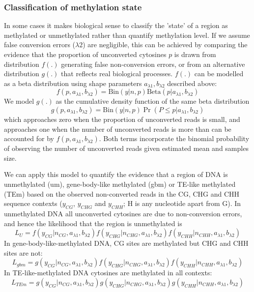 \documentclass[12pt,longbibliography]{article}
\begin{document}
\subsubsection{Classification of methylation state} \label{sec:meth-state}

In some cases it makes biological sense to classify the 'state' of a region as methylated or unmethylated rather than quantify methylation level.
If we assume false conversion errors ($\lambda2$) are negligible, this can be achieved by comparing the evidence that the proportion of unconverted cytosines $p$ is drawn from distribution $f(.)$ generating false non-conversion errors, or from an alternative distribution $g(.)$ that reflects real biological processes.
$f(.)$ can be modelled as a beta distribution using shape parameters $a_{\lambda1}, b_{\lambda2}$ described above:
\begin{equation}
    f(p,a_{\lambda1}, b_{\lambda2}) = 
    \textrm{Bin}(y|n,p)
    \textrm{Beta}(p | a_{\lambda1}, b_{\lambda2})
\end{equation}
We model $g(.)$ as the cumulative density function of the same beta distribution
\begin{equation}
    g(p,a_{\lambda1}, b_{\lambda2}) = 
    \textrm{Bin}(y|n,p)
    \Pr( P \leq p | a_{\lambda1}, b_{\lambda2})
\end{equation}
which approaches zero when the proportion of unconverted reads is small, and approaches one when the number of unconverted reads is more than can be accounted for by $ f(p,a_{\lambda1}, b_{\lambda2}) $.
Both terms incorporate the binomial probability of observing the number of unconverted reads given estimated mean and samples size.

We can apply this model to quantify the evidence that a region of DNA is unmethylated (um), gene-body-like methylated (gbm) or TE-like methylated (TEm) based on the observed non-converted reads in the CG, CHG and CHH sequence contexts ($y_{CG}$, $y_{CHG}$ and $y_{CHH}$; H is any nucleotide apart from G).
In unmethylated DNA all unconverted cytosines are due to non-conversion errors, and hence the likelihood that the region is unmethylated is
\begin{equation}
    L_U =
    f(y_{CG}  | n_{CG},  a_{\lambda1}, b_{\lambda2})
    f(y_{CHG} | n_{CHG}, a_{\lambda1}, b_{\lambda2})
    f(y_{CHH} | n_{CHH}, a_{\lambda1}, b_{\lambda2})
\end{equation}
In gene-body-like-methylated DNA, CG sites are methylated but CHG and CHH sites are not: 
\begin{equation}
    L_{gbm} =
    g(y_{CG}  | n_{CG},  a_{\lambda1}, b_{\lambda2})
    f(y_{CHG} | n_{CHG}, a_{\lambda1}, b_{\lambda2})
    f(y_{CHH} | n_{CHH}, a_{\lambda1}, b_{\lambda2})
\end{equation}
In TE-like-methylated DNA cytosines are methylated in all contexts:
\begin{equation}
    L_{TEm} =
    g(y_{CG}  | n_{CG},  a_{\lambda1}, b_{\lambda2})
    g(y_{CHG} | n_{CHG}, a_{\lambda1}, b_{\lambda2})
    g(y_{CHH} | n_{CHH}, a_{\lambda1}, b_{\lambda2})
\end{equation}
\end{document}
